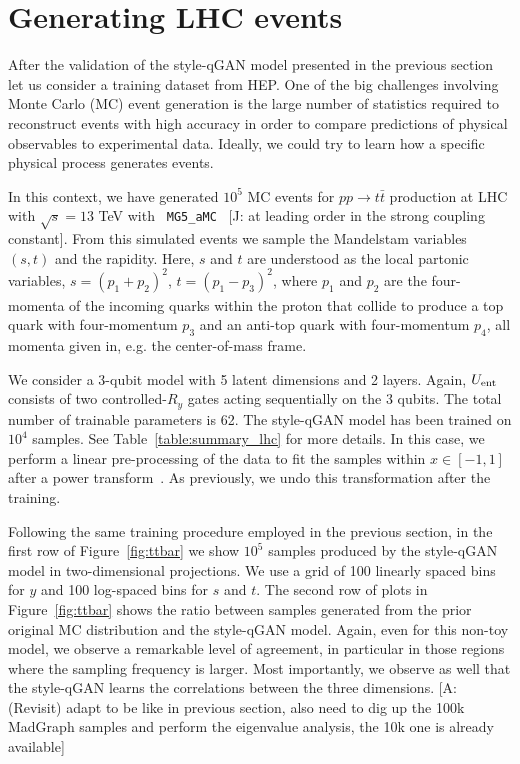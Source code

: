 \documentclass[twocolumn,preprintnumbers,superscriptaddress]{revtex4-2}
\newcommand{\commentJB}[1]{{\color{blue} {[J: #1]}}}
\newcommand{\commentAF}[1]{{\color{cyan} {[A: #1]}}}
\begin{document}
\section{Generating LHC events}
\label{sec:lhc}

After the validation of the style-qGAN model presented in the previous section
let us consider a training dataset from HEP. One of the big challenges involving
Monte Carlo (MC) event generation is the large number of statistics required to
reconstruct events with high accuracy in order to compare predictions of
physical observables to experimental data. Ideally, we could try
to learn how a specific physical process generates events.

In this context, we have generated $10^5$ MC events for $pp\rightarrow t\bar{t}$
production at LHC with $\sqrt{s} = 13$ TeV with {\tt
MG5\_aMC}~\cite{Alwall:2014hca,Frederix:2018nkq} \commentJB{at leading order in the strong coupling constant}. From this simulated events we
sample the Mandelstam variables $(s,t)$ and the rapidity. Here, $s$
and $t$ are understood as the local partonic variables,
$s=(p_1^{}+p_2^{})^2$, $t=(p_1^{}-p_3^{})_{}^2$, where $p_1^{}$ and
$p_2^{}$ are the four-momenta of the incoming quarks within the proton that collide to produce a top quark with four-momentum $p_3^{}$ and an anti-top quark with four-momentum $p_4^{}$, all momenta given in, e.g. the center-of-mass frame.

We consider a 3-qubit model with 5 latent dimensions and 2 layers. Again,
$U_{\rm ent}$ consists of two controlled-$R_{y}$ gates acting sequentially on
the 3 qubits. The total number of trainable parameters is 62. The style-qGAN
model has been trained on $10^4$ samples. See Table~\ref{table:summary_lhc} for more details. In this case, we perform a linear pre-processing of the data
to fit the samples within $x \in [-1, 1]$ after a power
transform~\cite{yeo2000new}. As previously, we undo this transformation after
the training.

Following the same training procedure employed in the previous section, in the
first row of Figure~\ref{fig:ttbar} we show $10^5$ samples produced by the
style-qGAN model in two-dimensional projections. We use a grid of 100 linearly
spaced bins for $y$ and 100 log-spaced bins for $s$ and $t$.
%
The second row of plots in Figure~\ref{fig:ttbar} shows the ratio between
samples generated from the prior original MC distribution and the style-qGAN
model. Again, even for this non-toy model, we observe a remarkable level of agreement, in particular in those regions
where the sampling frequency is larger. Most importantly, we observe as well that the style-qGAN learns
the correlations between the three dimensions. \commentAF{(Revisit) adapt to be like in previous section, also need to dig up the 100k MadGraph samples and perform the eigenvalue analysis, the 10k one is already available}
\end{document}
